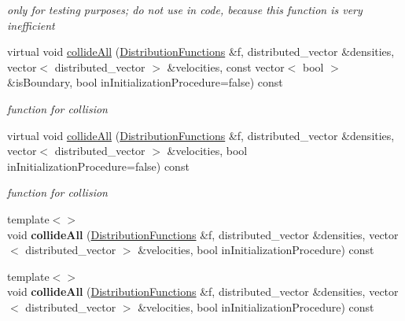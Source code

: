\begin{DoxyCompactItemize}
\begin{DoxyCompactList}\small\item\em only for testing purposes; do not use in code, because this function is very inefficient \end{DoxyCompactList}\item 
virtual void \hyperlink{classnatrium_1_1Collision_a5e1fe09430194ccb35bd2fcaa5958bf2}{collide\-All} (\hyperlink{classnatrium_1_1DistributionFunctions}{Distribution\-Functions} \&f, distributed\-\_\-vector \&densities, vector$<$ distributed\-\_\-vector $>$ \&velocities, const vector$<$ bool $>$ \&is\-Boundary, bool in\-Initialization\-Procedure=false) const 
\begin{DoxyCompactList}\small\item\em function for collision \end{DoxyCompactList}\item 
virtual void \hyperlink{classnatrium_1_1Collision_a12e3b507cbf329bbcc2bc8b9a184f6e2}{collide\-All} (\hyperlink{classnatrium_1_1DistributionFunctions}{Distribution\-Functions} \&f, distributed\-\_\-vector \&densities, vector$<$ distributed\-\_\-vector $>$ \&velocities, bool in\-Initialization\-Procedure=false) const 
\begin{DoxyCompactList}\small\item\em function for collision \end{DoxyCompactList}\item 
\hypertarget{classnatrium_1_1Collision_a978f4846827c2cf1129f560188807605}{{\footnotesize template$<$$>$ }\\void {\bfseries collide\-All} (\hyperlink{classnatrium_1_1DistributionFunctions}{Distribution\-Functions} \&f, distributed\-\_\-vector \&densities, vector$<$ distributed\-\_\-vector $>$ \&velocities, bool in\-Initialization\-Procedure) const}\label{classnatrium_1_1Collision_a978f4846827c2cf1129f560188807605}

\item 
\hypertarget{classnatrium_1_1Collision_a1a241ffb792c728a608580f9ab8dcb3d}{{\footnotesize template$<$$>$ }\\void {\bfseries collide\-All} (\hyperlink{classnatrium_1_1DistributionFunctions}{Distribution\-Functions} \&f, distributed\-\_\-vector \&densities, vector$<$ distributed\-\_\-vector $>$ \&velocities, bool in\-Initialization\-Procedure) const}\label{classnatrium_1_1Collision_a1a241ffb792c728a608580f9ab8dcb3d}

\end{DoxyCompactItemize}
